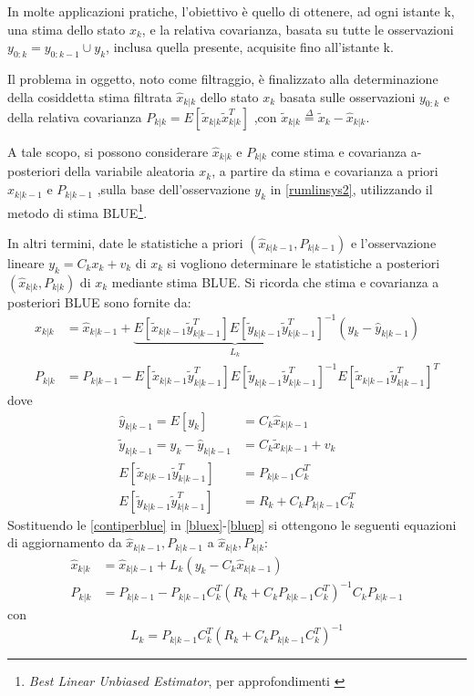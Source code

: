 In molte applicazioni pratiche, l’obiettivo è quello di ottenere, ad ogni istante k, una stima dello stato $x_k$, e la relativa covarianza, basata su tutte le osservazioni $y_{0:k}  = y_{0:k-1}\cup{y_k}$, inclusa quella presente, acquisite fino all’istante k.

Il problema in oggetto, noto come filtraggio, è finalizzato alla determinazione della cosiddetta stima filtrata $\hat{ x}_{ k|k}$ dello stato $x_k$ basata sulle osservazioni $y_{0:k}$ e della relativa covarianza $P_{k|k} = E[\tilde{x}_{k|k}\tilde{x}_{k|k}^T]$ ,con $\tilde{x}_{k|k}\stackrel{\Delta}{=}\tilde{x}_k-\hat{x}_{k|k}$. 

A tale scopo, si possono considerare $\hat{x}_{k|k}$ e  $P_{k|k}$ come stima e covarianza a-posteriori della variabile aleatoria $x_k$, a partire da stima e covarianza a priori $\hat{x}_{k|k-1}$ e $P_{k|k-1}$ ,sulla base dell'osservazione $y_k$ in \eqref{rumlinsys2}, utilizzando il metodo di stima BLUE\footnote{\emph{Best Linear Unbiased Estimator}, per approfondimenti \cite{stimablue}}.

In altri termini, date le statistiche a priori $(\hat{x}_{k|k-1},P_{k|k-1})$ e l’osservazione lineare $y_k=C_kx_k+v_k$ di $x_k$ si vogliono determinare le statistiche a posteriori $(\hat{x}_{k|k},P_{k|k})$ di $x_k$ mediante stima BLUE. Si ricorda che stima e covarianza a posteriori BLUE sono fornite da:
\begin{align}
\label{bluex}
\hat{x}_{k|k}&=\hat{x}_{k|k-1}+\underbrace{E[\tilde{x}_{k|k-1}\tilde{y}_{k|k-1}^T]E[\tilde{y}_{k|k-1}\tilde{y}_{k|k-1}^T]^{-1}}_{L_k}(y_k-\hat{y}_{k|k-1})\\
\label{bluep}
P_{k|k}&=P_{k|k-1}-E[\tilde{x}_{k|k-1}\tilde{y}_{k|k-1}^T]E[\tilde{y}_{k|k-1}\tilde{y}_{k|k-1}^T]^{-1}E[\tilde{x}_{k|k-1}\tilde{y}_{k|k-1}^T]^T
\end{align}
dove
\begin{equation}
\label{contiperblue}
\begin{split}
\hat{y}_{k|k-1} = E[y_k] &=C_k\hat{x}_{k|k-1} \\
\tilde{y}_{k|k-1} = y_k-\hat{y}_{k|k-1} &=C_k\tilde{x}_{k|k-1}+v_k\\
E[\tilde{x}_{k|k-1}\tilde{y}_{k|k-1}^T] &=P_{k|k-1}C_k^T\\
E[\tilde{y}_{k|k-1}\tilde{y}_{k|k-1}^T] &=R_k+C_kP_{k|k-1}C_k^T
\end{split}
\end{equation}
Sostituendo le \eqref{contiperblue} in \eqref{bluex}-\eqref{bluep} si ottengono le seguenti equazioni di aggiornamento da $\hat{x}_{k|k-1},P_{k|k-1}$ a $\hat{x}_{k|k},P_{k|k}$:
\begin{align}
\label{corrx}
\hat{x}_{k|k}&=\hat{x}_{k|k-1}+L_k(y_k-C_k\hat{x}_{k|k-1})\\
\label{corrp}
P_{k|k}&=P_{k|k-1}-P_{k|k-1}C_k^T(R_k+C_kP_{k|k-1}C_k^T)^{-1}C_kP_{k|k-1}
\end{align}
con
\begin{equation}
\label{defl}
L_k=P_{k|k-1}C_k^T(R_k+C_kP_{k|k-1}C_k^T)^{-1}
\end{equation}

